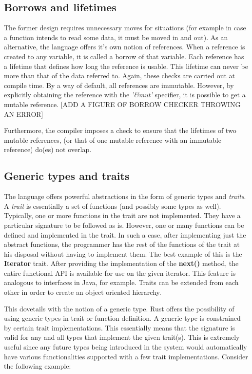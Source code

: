 \subsection{Borrows and lifetimes}
The former design requires unnecessary moves for situations (for example in case a function intends to read some data, it must be moved in and out). As an alternative, the language offers it's own notion of references. When a reference is created to any variable, it is called a borrow of that variable. Each reference has a lifetime that defines how long the reference is usable. This lifetime can never be more than that of the data referred to. Again, these checks are carried out at compile time. By a way of default, all references are immutable. However, by explicitly obtaining the reference with the \emph{'\&mut'} specifier, it is possible to get a mutable reference. [ADD A FIGURE OF BORROW CHECKER THROWING AN ERROR]

Furthermore, the compiler imposes a check to ensure that the lifetimes of two mutable references, (or that of one mutable reference with an immutable reference) do(es) not overlap.

\subsection{Generic types and traits}
The language offers powerful abstractions in the form of generic types and \emph{traits}. A \emph{trait} is essentially a set of functions (and possibly some types as well). Typically, one or more functions in the trait are not implemented. They have a particular signature to be followed as is. However, one or many functions can be defined and implemented in the trait. In such a case, after implementing just the abstract functions, the programmer has the rest of the functions of the trait at his disposal without having to implement them. The best example of this is the \textbf{Iterator} trait. After providing the implementation of the \textbf{next()} method, the entire functional API is available for use on the given iterator. This feature is analogous to interfaces in Java, for example. Traits can be extended from each other in order to create an object oriented hierarchy.

This dovetails with the notion of a generic type. Rust offers the possibility of using generic types in trait or function definition. A generic type is constrained by certain trait implementations. This essentially means that the signature is valid for any and all types that implement the given trait(s). This is extremely useful since any future types being introduced in the system would automatically have various functionalities supported with a few trait implementations. Consider the following example:

